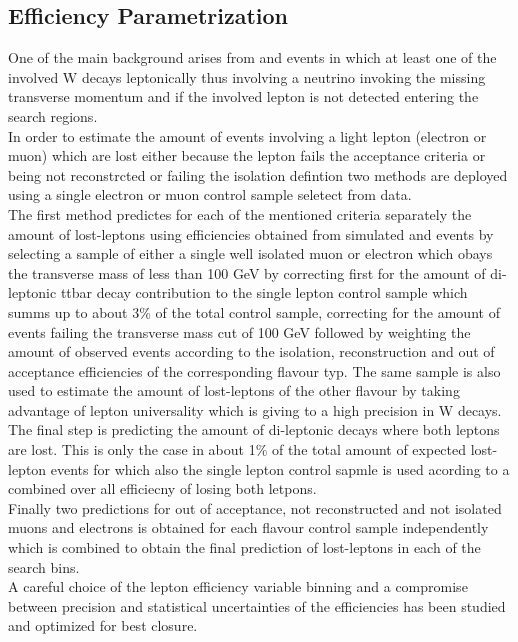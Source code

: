 \documentclass{beamer}
\begin{document}
\subsection{Efficiency Parametrization}
\begin{frame}
 One of the main background arises from \ttbar and \wpj events in which at least one of the involved W decays leptonically thus involving a neutrino invoking the missing transverse momentum and if the involved lepton is not detected entering the search regions. \\
 In order to estimate the amount of events involving a light lepton (electron or muon) which are lost either because the lepton fails the acceptance criteria or being not reconstrcted or failing the isolation defintion two methods are deployed using a single electron or muon control sample seletect from data. \\
 The first method predictes for each of the mentioned criteria separately the amount of lost-leptons using efficiencies obtained from simulated \ttbar and \wpj events by selecting a sample of either a single well isolated muon or electron which obays the transverse mass of less than 100 GeV by correcting first for the amount of di-leptonic ttbar decay contribution to the single lepton control sample which summs up to about 3\% of the total control sample, correcting for the amount of events failing the transverse mass cut of 100 GeV followed by weighting the amount of observed events according to the isolation, reconstruction and out of acceptance efficiencies of the corresponding flavour typ. The same sample is also used to estimate the amount of lost-leptons of the other flavour by taking advantage of lepton universality which is giving to a high precision in W decays. The final step is predicting the amount of di-leptonic \ttbar decays where both leptons are lost. This is only the case in about 1\% of the total amount of expected lost-lepton events for which also the single lepton control sapmle is used acording to a combined over all efficiecny of losing both letpons.\\
 Finally two predictions for out of acceptance, not reconstructed and not isolated muons and electrons is obtained for each flavour control sample independently which is combined to obtain the final prediction of lost-leptons in each of the search bins. \\
 A careful choice of the lepton efficiency variable binning and a compromise between precision and statistical uncertainties of the efficiencies has been studied and optimized for best closure. \\

\end{frame}
\end{document}
